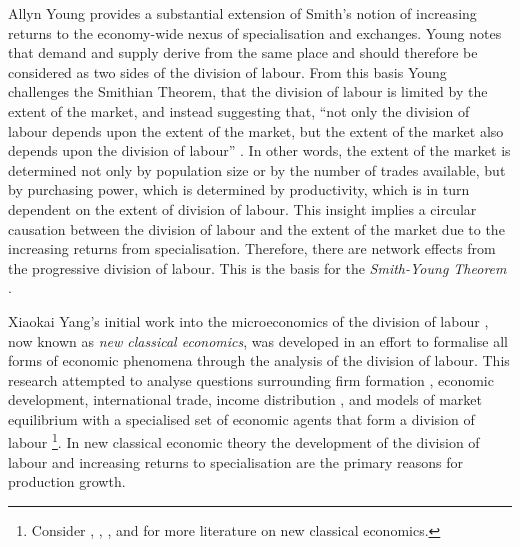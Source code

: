Allyn Young provides a substantial extension of Smith's notion of increasing returns to the economy-wide nexus of specialisation and exchanges. Young notes that demand and supply derive from the same place and should therefore be considered as two sides of the division of labour. From this basis Young challenges the Smithian Theorem, that the division of labour is limited by the extent of the market, and instead suggesting that, ``not only the division of labour depends upon the extent of the market, but the extent of the market also depends upon the division of labour'' \citep[p.~539]{Young1928}. In other words, the extent of the market is determined not only by population size or by the number of trades available, but by purchasing power, which is determined by productivity, which is in turn dependent on the extent of division of labour. This insight implies a circular causation between the division of labour and the extent of the market due to the increasing returns from specialisation. Therefore, there are network effects from the progressive division of labour. This is the basis for the \textit{Smith-Young Theorem} \citep{Yang2001}.

Xiaokai Yang's initial work into the microeconomics of the division of labour \citep{Yang1988}, now known as \emph{new classical economics}, was developed in an effort to formalise all forms of economic phenomena through the analysis of the division of labour. This research attempted to analyse questions surrounding firm formation \citep{YangNg1995, Yang2000}, economic development, international trade, income distribution \citep{YangZhang2003}, and models of market equilibrium with a specialised set of economic agents that form a division of labour \citep{Yao2002, SunYangZhou2004, YangYao2005} \footnote{Consider \citet{YangNg1993}, \citet{YangChengShi2005}, \citet{TombazosYang2006}, and \citet{YangLiu2008} for more literature on new classical economics.}. In new classical economic theory the development of the division of labour and increasing returns to specialisation are the primary reasons for production growth.



